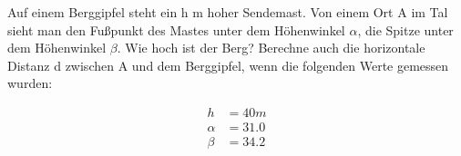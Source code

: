 
Auf einem Berggipfel steht ein h m hoher Sendemast. Von einem Ort A im Tal sieht man den Fußpunkt des Mastes
unter dem Höhenwinkel $\alpha$, die Spitze unter dem Höhenwinkel $\beta$. Wie hoch ist der Berg? Berechne
auch die horizontale Distanz d zwischen A und dem Berggipfel, wenn die folgenden Werte gemessen wurden:

\begin{align}
	h &= 40m\\
	\alpha &= 31.0\\
	\beta &= 34.2
\end{align}
